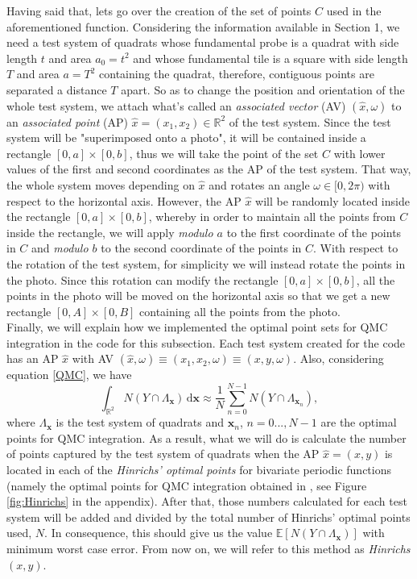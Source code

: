 Having said that, lets go over the creation of the set of points $C$ used in the aforementioned function. Considering the information available in Section 1, we need a test system of quadrats whose fundamental probe is a quadrat with side length $t$ and area $a_0=t^2$ and whose fundamental tile is a square with side length $T$ and area $a=T^2$ containing the quadrat, therefore, contiguous points are separated a distance $T$ apart. So as to change the position and orientation of the whole test system, we attach what's called an \textit{associated vector} (AV) $(\widehat{x},\omega)$ to an \textit{associated point} (AP) $\widehat{x}=(x_1,x_2) \in \mathbb{R}^2$ of the test system. Since the test system will be "superimposed onto a photo", it will be contained inside a rectangle $[0,a]\times[0,b]$, thus we will take the point of the set $C$ with lower values of the first and second coordinates as the AP of the test system. That way, the whole system moves depending on $\widehat{x}$ and rotates an angle $\omega \in [0,2\pi)$ with respect to the horizontal axis. However, the AP $\widehat{x}$ will be randomly located inside the rectangle $[0,a]\times[0,b]$, whereby in order to maintain all the points from $C$ inside the rectangle, we will apply \textit{modulo $a$} to the first coordinate of the points in $C$ and \textit{modulo $b$} to the second coordinate of the points in $C$. With respect to the rotation of the test system, for simplicity we will instead rotate the points in the photo. Since this rotation can modify the rectangle $[0,a]\times[0,b]$, all the points in the photo will be moved on the horizontal axis so that we get a new rectangle $[0,A]\times[0,B]$ containing all the points from the photo.\\


Finally, we will explain how we implemented the optimal point sets for QMC integration in the code for this subsection. Each test system created for the code has an AP $\widehat{x}$ with AV $(\widehat{x},\omega)\equiv(x_1,x_2,\omega)\equiv(x,y,\omega)$. Also, considering equation \eqref{QMC}, we have
\begin{equation*}
    \int_{\mathbb{R}^2} N(Y\cap \Lambda_{\textbf{x}}) \,\mathrm{d}\textbf{x} \approx  \frac{1}{N} \sum_{n=0}^{N-1} N(Y\cap \Lambda_{\textbf{x}_n}),
\end{equation*}
where $\Lambda_{\textbf{x}}$ is the test system of quadrats and $\textbf{x}_n$, $n=0...,N-1$ are the optimal points for QMC integration. As a result, what we will do is calculate the number of points captured by the test system of quadrats when the AP $\widehat{x}=(x,y)$ is located in each of the \textit{Hinrichs' optimal points} for bivariate periodic functions (namely the optimal points for QMC integration obtained in \cite{Hinrichs.pdf}, see Figure \ref{fig:Hinrichs} in the appendix). After that, those numbers calculated for each test system will be added and divided by the total number of Hinrichs' optimal points used, $N$. In consequence, this should give us the value $\mathbb{E}[N(Y\cap \Lambda_{\textbf{x}})]$ with minimum worst case error. From now on, we will refer to this method as \textit{Hinrichs $(x,y)$}.\\

